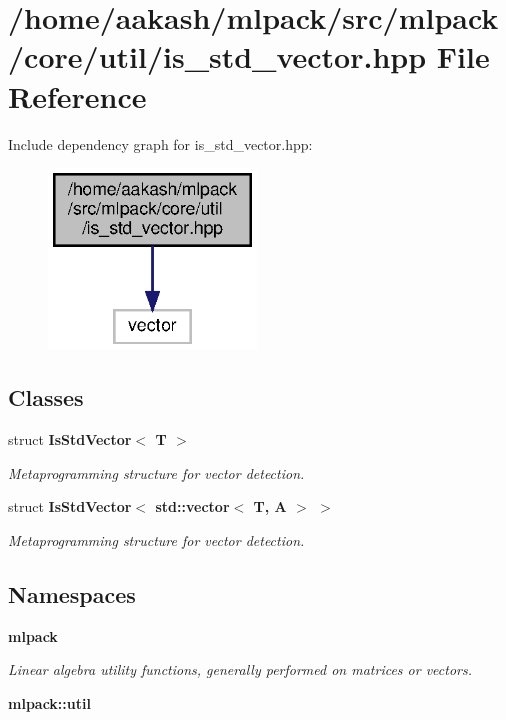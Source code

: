 \section{/home/aakash/mlpack/src/mlpack/core/util/is\+\_\+std\+\_\+vector.hpp File Reference}
\label{is__std__vector_8hpp}
Include dependency graph for is\+\_\+std\+\_\+vector.\+hpp\+:
\nopagebreak
\begin{figure}[H]
\begin{center}
\leavevmode
\includegraphics[width=157pt]{is__std__vector_8hpp__incl}
\end{center}
\end{figure}
\subsection*{Classes}
\begin{DoxyCompactItemize}
\item 
struct \textbf{ Is\+Std\+Vector$<$ T $>$}
\begin{DoxyCompactList}\small\item\em Metaprogramming structure for vector detection. \end{DoxyCompactList}\item 
struct \textbf{ Is\+Std\+Vector$<$ std\+::vector$<$ T, A $>$ $>$}
\begin{DoxyCompactList}\small\item\em Metaprogramming structure for vector detection. \end{DoxyCompactList}\end{DoxyCompactItemize}
\subsection*{Namespaces}
\begin{DoxyCompactItemize}
\item 
 \textbf{ mlpack}
\begin{DoxyCompactList}\small\item\em Linear algebra utility functions, generally performed on matrices or vectors. \end{DoxyCompactList}\item 
 \textbf{ mlpack\+::util}
\end{DoxyCompactItemize}



